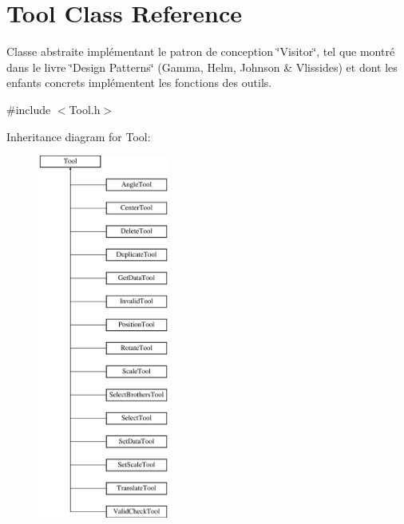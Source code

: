 \hypertarget{class_tool}{}\section{Tool Class Reference}
\label{class_tool}


Classe abstraite implémentant le patron de conception \char`\"{}\+Visitor\char`\"{}, tel que montré dans le livre \char`\"{}\+Design Patterns\char`\"{} (Gamma, Helm, Johnson \& Vlissides) et dont les enfants concrets implémentent les fonctions des outils.  




{\ttfamily \#include $<$Tool.\+h$>$}

Inheritance diagram for Tool\+:\begin{figure}[H]
\begin{center}
\leavevmode
\includegraphics[height=12.000000cm]{class_tool}
\end{center}
\end{figure}
